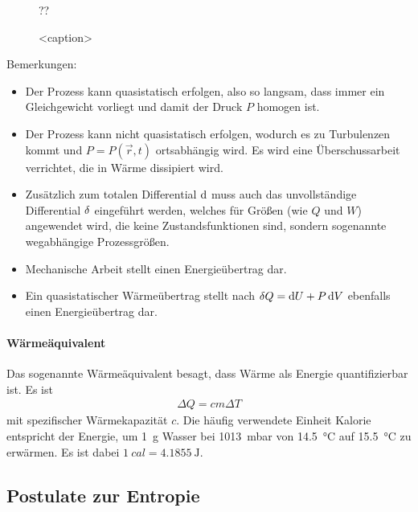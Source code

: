 \begin{figure}[htb]
    \centering
    ??
    \caption{<caption>}
    \label{fig:}
\end{figure}


Bemerkungen:
\begin{itemize}
    \item Der Prozess kann quasistatisch erfolgen, also so langsam, dass immer ein Gleichgewicht vorliegt und damit der Druck $P$ homogen ist.
    \item Der Prozess kann nicht quasistatisch erfolgen, wodurch es zu Turbulenzen kommt und $P=P(\vec r,t)$ ortsabhängig wird. Es wird eine Überschussarbeit verrichtet, die in Wärme dissipiert wird.
    \item Zusätzlich zum totalen Differential $\mathop{}\!\mathrm{d}$ muss auch das unvollständige Differential $\mathop{}\!\mathrm{\delta}$ eingeführt werden, welches für Größen (wie $Q$ und $W$) angewendet wird, die keine Zustandsfunktionen sind, sondern sogenannte wegabhängige Prozessgrößen.
    \item Mechanische Arbeit stellt einen Energieübertrag dar.
    \item Ein quasistatischer Wärmeübertrag stellt nach $\mathop{}\!\mathrm{\delta} Q=\mathop{}\!\mathrm{d} U+P\mathop{}\!\mathrm{d} V$ ebenfalls einen Energieübertrag dar.
\end{itemize}


\paragraph*{Wärmeäquivalent}

Das sogenannte Wärmeäquivalent besagt, dass Wärme als Energie quantifizierbar ist. Es ist
\begin{align*}
    \Delta Q = cm\Delta T
\end{align*}
mit spezifischer Wärmekapazität $c$.
Die häufig verwendete Einheit Kalorie entspricht der Energie, um \SI{1}{\g} Wasser bei \SI{1013}{\milli\bar} von \SI{14,5}{\degreeCelsius} auf \SI{15,5}{\degreeCelsius} zu erwärmen. Es ist dabei $\SI{1}{cal} = \SI{4,1855}{\joule}$.



\subsection{Postulate zur Entropie}